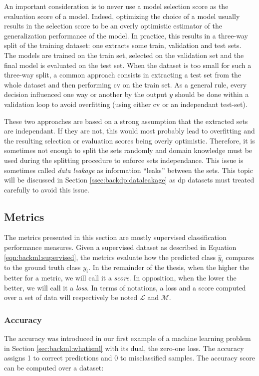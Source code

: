 An important consideration is to never use a model selection score as the evaluation
score of a model. Indeed, optimizing the choice of a model usually results in the
selection score to be an overly optimistic estimator of the generalization
performance of the model. In practice, this results in a three-way split of the
training dataset: one extracts some train, validation and test sets. The models
are trained on the train set, selected on the validation set and the final model
is evaluated on the test set. When the dataset is too small for such a three-way
split, a common approach consists in extracting a test set from the whole dataset
and then performing \acrlong{cv} on the train set. As a general rule, every decision
influenced one way or another by the output $y$ should be done within a validation
loop to avoid overfitting (using either \acrlong{cv} or an independant
test-set).

These two approaches are based on a strong assumption that the extracted sets are
independant. If they are not, this would most probably lead to overfitting and
the resulting selection or evaluation scores being overly optimistic. Therefore,
it is sometimes not enough to split the sets randomly and domain knowledge must
be used during the splitting procedure to enforce sets independance. This issue
is sometimes called \textit{data leakage} \parencite{kaufman2012leakage} as
information ``leaks'' between the sets. This topic will be discussed in Section
\ref{ssec:backdp:dataleakage} as \acrlong{dp} datasets must treated carefully to avoid
this issue.

\subsection{Metrics}
\label{ssec:backml:metrics}

The metrics presented in this section are mostly supervised classification
performance measures. Given a supervised dataset as described in Equation
\ref{eqn:backml:supervised}, the metrics evaluate how the predicted class $\hat{y}_i$
compares to the ground truth class $y_i$. In the remainder of the thesis, when
the higher the better for a metric, we will call it a \textit{score}. In opposition,
when the lower the better, we will call it a \textit{loss}. In terms of notations,
a loss and a score computed over a set of data will respectively be noted
$\mathcal{L}$ and $\mathcal{M}$.

\subsubsection{Accuracy}
\label{sssec:backml:metric:acc}
The accuracy was introduced in our first example of a machine learning problem in
Section \ref{sec:backml:whatisml} with its dual, the zero-one loss. The accuracy
assigns 1 to correct predictions and 0 to misclassified samples. The accuracy
score can be computed over a dataset:

